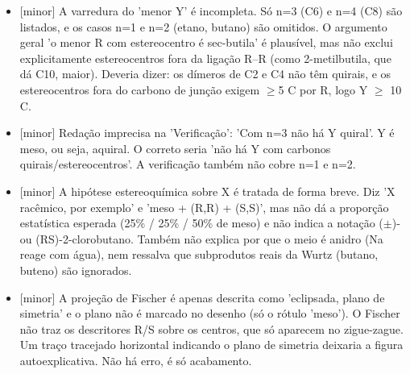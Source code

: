\documentclass{article}%
\begin{document}
\begin{itemize}%
\item%
{[}minor{]} A varredura do 'menor Y' é incompleta. Só n=3 (C6) e n=4 (C8) são listados, e os casos n=1 e n=2 (etano, butano) são omitidos. O argumento geral 'o menor R com estereocentro é sec{-}butila' é plausível, mas não exclui explicitamente estereocentros fora da ligação R--R (como 2{-}metilbutila, que dá C10, maior). Deveria dizer: os dímeros de C2 e C4 não têm quirais, e os estereocentros fora do carbono de junção exigem $\geq$5 C por R, logo Y $\geq$ 10 C.%
\item%
{[}minor{]} Redação imprecisa na 'Verificação': 'Com n=3 não há Y quiral'. Y é meso, ou seja, aquiral. O correto seria 'não há Y com carbonos quirais/estereocentros'. A verificação também não cobre n=1 e n=2.%
\item%
{[}minor{]} A hipótese estereoquímica sobre X é tratada de forma breve. Diz 'X racêmico, por exemplo' e 'meso + (R,R) + (S,S)', mas não dá a proporção estatística esperada (25\% / 25\% / 50\% de meso) e não indica a notação ($\pm$){-} ou (RS){-}2{-}clorobutano. Também não explica por que o meio é anidro (Na reage com água), nem ressalva que subprodutos reais da Wurtz (butano, buteno) são ignorados.%
\item%
{[}minor{]} A projeção de Fischer é apenas descrita como 'eclipsada, plano de simetria' e o plano não é marcado no desenho (só o rótulo 'meso'). O Fischer não traz os descritores R/S sobre os centros, que só aparecem no zigue{-}zague. Um traço tracejado horizontal indicando o plano de simetria deixaria a figura autoexplicativa. Não há erro, é só acabamento.%
\end{itemize}%
\end{document}
